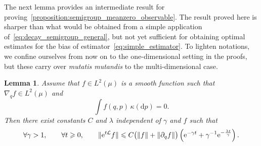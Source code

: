 \documentclass[11pt,a4paper]{article}
\newcommand{\e}{\mathrm{e}}
\newcommand{\grad}{\nabla}
\renewcommand{\d}{\mathrm d}
\theoremstyle{plain}
\newtheorem{lemma}{Lemma}[section]
\numberwithin{equation}{section}
\renewcommand{\leq}{\leqslant}
\renewcommand{\geq}{\geqslant}
\begin{document}

The next lemma provides an intermediate result for proving~\cref{proposition:semigroup_meanzero_observable}.
The result proved here is sharper than what would be obtained from a simple application of~\eqref{eq:decay_semigroup_general},
but not yet sufficient for obtaining optimal estimates for the bias of estimator~\eqref{eq:simple_estimator}.
To lighten notations,
we confine ourselves from now on to the one-dimensional setting in the proofs,
but these carry over \emph{mutatis mutandis} to the multi-dimensional case.
\begin{lemma}
    \label{lemma:initial_lemma}
    Assume that $f \in L^2(\mu)$ is a smooth function such that $\grad_q f \in L^2(\mu)$ and
    \begin{equation}
        \label{eq:assumption_f}
        \int f(q, p) \, \kappa(\d p) = 0.
    \end{equation}
    Then there exist constants $C$ and $\lambda$ independent of $\gamma$ and $f$ such that
    \[
        \forall \gamma > 1, \qquad
        \forall t \geq 0, \qquad
        \norm*{\e^{t\mathcal L} f}
        \leq C \bigl( \norm{f} + \norm{\partial_q f} \bigr)
        \left( \e^{- \gamma t} + \gamma^{-1} \e^{-\frac{\lambda t}{\gamma}} \right).
    \]
\end{lemma}
\end{document}
